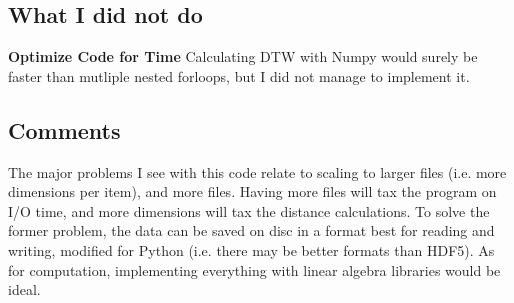 \documentclass[12pt,a4paper]{article}
\begin{document}
\subsection*{What I did not do}

\textbf{Optimize Code for Time} Calculating DTW with Numpy would surely be faster than mutliple nested forloops, but I did not manage to implement it.

\subsection*{Comments}

The major problems I see with this code relate to scaling to larger files (i.e. more dimensions per item), and more files. Having more files will tax the program on I/O time, and more dimensions will tax the distance calculations. To solve the former problem, the data can be saved on disc in a format best for reading and writing, modified for Python (i.e. there may be better formats than HDF5). As for computation, implementing everything with linear algebra libraries would be ideal.
\end{document}
